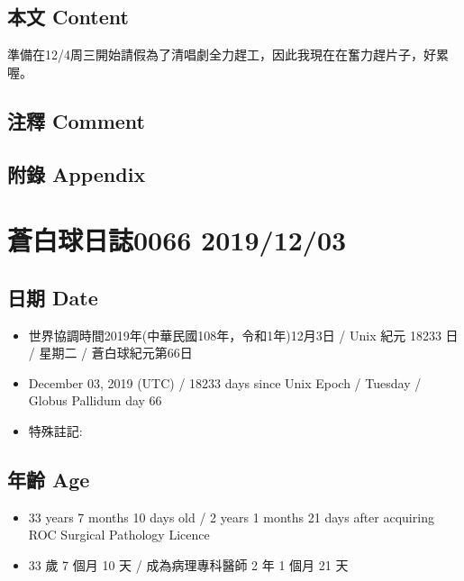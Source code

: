 \documentclass[a5paper, 12pt
]{book}
\providecommand{\tightlist}{%
  \setlength{\itemsep}{0pt}\setlength{\parskip}{0pt}}
\begin{document}
\hypertarget{ux672cux6587-content-1}{%
\subsection{本文 Content}\label{ux672cux6587-content-1}}

準備在12/4周三開始請假為了清唱劇全力趕工，因此我現在在奮力趕片子，好累喔。

\hypertarget{ux6ce8ux91cb-comment-1}{%
\subsection{注釋 Comment}\label{ux6ce8ux91cb-comment-1}}

\hypertarget{ux9644ux9304-appendix-1}{%
\subsection{附錄 Appendix}\label{ux9644ux9304-appendix-1}}

\hypertarget{ux84bcux767dux7403ux65e5ux8a8c0066-20191203}{%
\section{蒼白球日誌0066
2019/12/03}\label{ux84bcux767dux7403ux65e5ux8a8c0066-20191203}}

\hypertarget{ux65e5ux671f-date-2}{%
\subsection{日期 Date}\label{ux65e5ux671f-date-2}}

\begin{itemize}
\tightlist
\item
  世界協調時間2019年(中華民國108年，令和1年)12月3日 / Unix 紀元 18233 日
  / 星期二 / 蒼白球紀元第66日
\item
  December 03, 2019 (UTC) / 18233 days since Unix Epoch / Tuesday /
  Globus Pallidum day 66
\item
  特殊註記:
\end{itemize}

\hypertarget{ux5e74ux9f61-age-2}{%
\subsection{年齡 Age}\label{ux5e74ux9f61-age-2}}

\begin{itemize}
\tightlist
\item
  33 years 7 months 10 days old / 2 years 1 months 21 days after
  acquiring ROC Surgical Pathology Licence
\item
  33 歲 7 個月 10 天 / 成為病理專科醫師 2 年 1 個月 21 天
\end{itemize}
\end{document}
